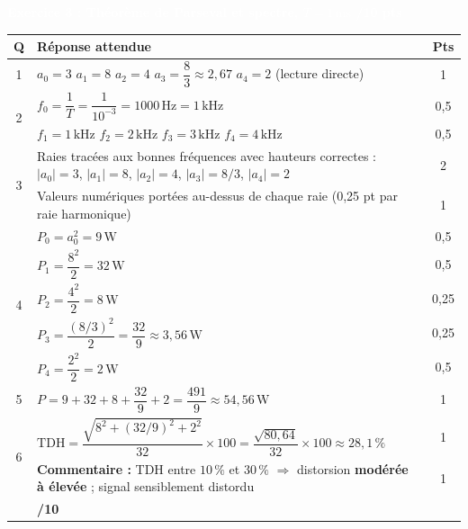 \documentclass[10pt,a4paper]{article}
\renewcommand{\arraystretch}{1.35}
\newcommand{\exotitle}[2]{%
  \noindent\colorbox{exoheader}{%
    \parbox{\dimexpr\linewidth-2\fboxsep\relax}{%
      \textcolor{white}{\textbf{\large #1 \hfill #2}}%
    }%
  }%
}
\begin{document}
\vfill 

\newpage 

\exotitle{Exercice 3 : Théorème de Parseval et spectre, $T = 1\,\mathrm{ms}$}{/10 pts}

\vspace{5mm}

\renewcommand{\arraystretch}{2.7}
\begin{tabularx}{\linewidth}{|c|X|c|}
  \hline
  \rowcolor{exolight}
  \textbf{Q} & \textbf{Réponse attendue} & \textbf{Pts} \\
  \hline
  1
    & $a_0 = 3$ \quad $a_1 = 8$ \quad $a_2 = 4$ \quad $a_3 = \dfrac{8}{3} \approx 2{,}67$ \quad $a_4 = 2$ \quad (lecture directe)
    & 1 \\
  \hline
  \multirow{2}{*}{2}
    & $f_0 = \dfrac{1}{T} = \dfrac{1}{10^{-3}} = 1000\,\mathrm{Hz} = 1\,\mathrm{kHz}$
    & 0{,}5 \\
  \cline{2-3}
    & $f_1 = 1\,\mathrm{kHz}$ \quad $f_2 = 2\,\mathrm{kHz}$ \quad $f_3 = 3\,\mathrm{kHz}$ \quad $f_4 = 4\,\mathrm{kHz}$
    & 0{,}5 \\
  \hline
  \multirow{2}{*}{3}
    & Raies tracées aux bonnes fréquences avec hauteurs correctes :
      $|a_0|=3$,\; $|a_1|=8$,\; $|a_2|=4$,\; $|a_3|=8/3$,\; $|a_4|=2$
    & 2 \\
  \cline{2-3}
    & Valeurs numériques portées au-dessus de chaque raie (0,25 pt par raie harmonique)
    & 1 \\
  \hline
  \multirow{5}{*}{4}
    & $P_0 = a_0^2 = 9\,\mathrm{W}$
    & 0{,}5 \\
  \cline{2-3}
    & $P_1 = \dfrac{8^2}{2} = 32\,\mathrm{W}$
    & 0{,}5 \\
  \cline{2-3}
    & $P_2 = \dfrac{4^2}{2} = 8\,\mathrm{W}$
    & 0{,}25 \\
  \cline{2-3}
    & $P_3 = \dfrac{(8/3)^2}{2} = \dfrac{32}{9} \approx 3{,}56\,\mathrm{W}$
    & 0{,}25 \\
  \cline{2-3}
    & $P_4 = \dfrac{2^2}{2} = 2\,\mathrm{W}$
    & 0{,}5 \\
  \hline
  5
    & $P = 9 + 32 + 8 + \dfrac{32}{9} + 2 = \dfrac{491}{9} \approx 54{,}56\,\mathrm{W}$
    & 1 \\
  \hline
  \multirow{2}{*}{6}
    & $\mathrm{TDH} = \dfrac{\sqrt{8^2 + (32/9)^2 + 2^2}}{32}\times100 = \dfrac{\sqrt{80{,}64}}{32}\times100 \approx 28{,}1\,\%$
    & 1 \\
  \cline{2-3}
    & \textbf{Commentaire :} TDH entre $10\,\%$ et $30\,\%$ $\Rightarrow$ distorsion \textbf{modérée à élevée} ; signal sensiblement distordu
    & 1 \\
  \hline
  \rowcolor{totalrow}
  \multicolumn{2}{|r|}{\textbf{Sous-total Exercice 3}} & \textbf{/10} \\
  \hline
\end{tabularx}

\vfill 
\end{document}
